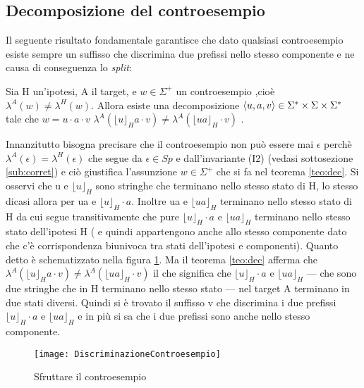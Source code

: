 \subsection[Decomposizione controesempio]{Decomposizione del controesempio}
Il seguente risultato fondamentale \cite{Schapire93} garantisce che dato qualsiasi controesempio esiste sempre un suffisso che discrimina due prefissi nello stesso componente e ne causa di conseguenza lo \textit{split}:
\begin{teorema}\label{teo:dec} Sia H un'ipotesi, A il target, e $w \in \Sigma^{+}$ un controesempio ,cioè $\lambda^{A}(w) \neq \lambda^{H}(w)$. Allora esiste una decomposizione $\Braket{u,a,v} \in \Sigma^{*} \times \Sigma \times \Sigma^{*}$ tale che $w = u\!\cdot\! a\!\cdot\! v$  $\lambda^{A}(\lfloor u \rfloor_{H} a \cdot v) \neq \lambda^{A}(\lfloor ua \rfloor_{H} \cdot v)$ .
\end{teorema}  
Innanzitutto bisogna precisare che il controesempio non può essere mai $\epsilon$ perchè $\lambda^A(\epsilon) = \lambda^H(\epsilon)$ che segue da $\epsilon \in Sp$ e dall'invariante (I2) (vedasi sottosezione \ref{sub:corret}) e ciò giustifica l'assunzione $w \in \Sigma^{+}$ che si fa nel teorema \ref{teo:dec}. Si osservi che u e $\lfloor u \rfloor_{H}$ sono stringhe che terminano nello stesso stato di \ac{H}, lo stesso dicasi allora per ua e $\lfloor u \rfloor_{H}\cdot a$. Inoltre ua e $\lfloor ua \rfloor_{H}$ terminano nello stesso stato di \ac{H} da cui segue transitivamente che pure $\lfloor u \rfloor_{H}\cdot a$ e $\lfloor ua \rfloor_{H}$  terminano nello stesso stato dell'ipotesi \ac{H} ( e quindi appartengono anche allo stesso componente dato che c'è corrispondenza biunivoca tra stati dell'ipotesi e componenti). Quanto detto è schematizzato nella figura \ref{fig:con}. Ma il teorema \ref{teo:dec} afferma che $\lambda^{A}(\lfloor u \rfloor_{H} a \cdot v) \neq \lambda^{A}(\lfloor ua \rfloor_{H} \cdot v)$ il che significa che $\lfloor u \rfloor_{H}\cdot a$ e $\lfloor ua \rfloor_{H}$ --- che sono due stringhe che in \ac{H} terminano nello stesso stato --- nel target A terminano in due stati diversi. Quindi si è trovato il suffisso v che discrimina i due prefissi $\lfloor u \rfloor_{H} \cdot a$ e $\lfloor ua \rfloor_{H}$ e in più si sa che i due prefissi sono anche nello stesso componente.
\begin{figure}[htp]
	\centering
	\texttt{[image: DiscriminazioneControesempio]}
	\caption[Sfruttare il controesempio]{Sfruttare il controesempio}
   \label{fig:con}
\end{figure}

